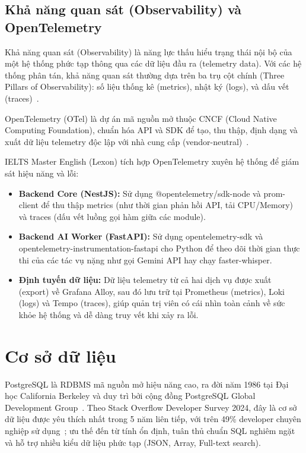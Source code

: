 \subsection{Khả năng quan sát (Observability) và OpenTelemetry}

Khả năng quan sát (Observability) là năng lực thấu hiểu trạng thái nội bộ của một hệ thống phức tạp thông qua các dữ liệu đầu ra (telemetry data). Với các hệ thống phân tán, khả năng quan sát thường dựa trên ba trụ cột chính (Three Pillars of Observability): số liệu thống kê (metrics), nhật ký (logs), và dấu vết (traces)~\cite{opentelemetry-docs}.

OpenTelemetry (OTel) là dự án mã nguồn mở thuộc CNCF (Cloud Native Computing Foundation), chuẩn hóa API và SDK để tạo, thu thập, định dạng và xuất dữ liệu telemetry độc lập với nhà cung cấp (vendor-neutral)~\cite{opentelemetry-docs}.

IELTS Master English (Lexon) tích hợp OpenTelemetry xuyên hệ thống để giám sát hiệu năng và lỗi:
\begin{itemize}
    \item \textbf{Backend Core (NestJS):} Sử dụng @opentelemetry/sdk-node và prom-client để thu thập metrics (như thời gian phản hồi API, tải CPU/Memory) và traces (dấu vết luồng gọi hàm giữa các module).
    \item \textbf{Backend AI Worker (FastAPI):} Sử dụng opentelemetry-sdk và opentelemetry-instrumentation-fastapi cho Python để theo dõi thời gian thực thi của các tác vụ nặng như gọi Gemini API hay chạy faster-whisper.
    \item \textbf{Định tuyến dữ liệu:} Dữ liệu telemetry từ cả hai dịch vụ được xuất (export) về Grafana Alloy, sau đó lưu trữ tại Prometheus (metrics), Loki (logs) và Tempo (traces), giúp quản trị viên có cái nhìn toàn cảnh về sức khỏe hệ thống và dễ dàng truy vết khi xảy ra lỗi.
\end{itemize}

\section{Cơ sở dữ liệu}

PostgreSQL là RDBMS mã nguồn mở hiệu năng cao, ra đời năm 1986 tại Đại học California Berkeley và duy trì bởi cộng đồng PostgreSQL Global Development Group~\cite{postgresql-docs}. Theo Stack Overflow Developer Survey 2024, đây là cơ sở dữ liệu được yêu thích nhất trong 5 năm liên tiếp, với trên 49\% developer chuyên nghiệp sử dụng~\cite{stackoverflow-survey-2024}; ưu thế đến từ tính ổn định, tuân thủ chuẩn SQL nghiêm ngặt và hỗ trợ nhiều kiểu dữ liệu phức tạp (JSON, Array, Full-text search).

